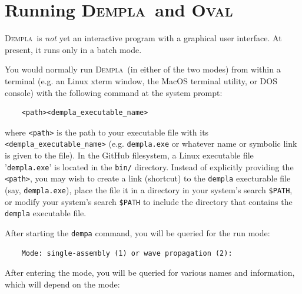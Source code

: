 \documentclass[letterpaper,11pt]{article}
\newcommand{\Oval}{\textsc{Oval}}
\newcommand{\Dempla}{\textsc{Dempla}}
\begin{document}
\section{Running \Dempla\ and \Oval} \label{sec:RunOval}
\Dempla\ is \emph{not} yet an interactive program with a graphical
user interface.
At present, it runs only in a batch mode.
%
\par
You would normally run \Dempla\ (in either of the two modes)
from within a terminal (e.g. an Linux xterm window, the
MacOS terminal utility,
or DOS console) with the following command at the system prompt:
\begin{verbatim}
    <path><dempla_executable_name>
\end{verbatim}
where \texttt{<path>} is the path to your executable
file with its \texttt{<dempla\_executable\_name>}
(e.g. \texttt{dempla.exe} or whatever
name or symbolic link is given to the file).
In the GitHub filesystem,
a Linux executable file '\texttt{dempla.exe}'
is located in the \texttt{bin/} directory.
Instead of explicitly providing the \texttt{<path>}, you may wish to
create a link (shortcut) to the \texttt{dempla} execturable file
(say, \texttt{dempla.exe}),
place the file it in a directory in your system's search \texttt{\$PATH}, 
or modify your system's search \texttt{\$PATH} to include
the directory that contains the \texttt{dempla} executable file.
\par
After starting the \texttt{dempa} command, you
will be queried for the run mode:
%
\begin{verbatim}
    Mode: single-assembly (1) or wave propagation (2):
\end{verbatim}
%
After entering the mode, you will be queried for various names
and information, which will
depend on the mode:
%
\end{document}
